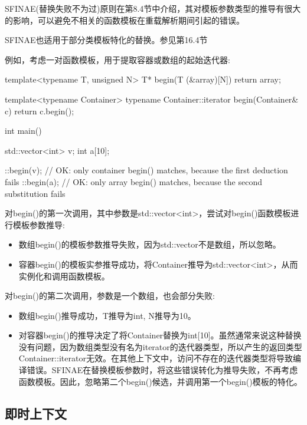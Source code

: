 

SFINAE(替换失败不为过)原则在第8.4节中介绍，其对模板参数类型的推导有很大的影响，可以避免不相关的函数模板在重载解析期间引起的错误。

\begin{notice}SFINAE也适用于部分类模板特化的替换。参见第16.4节
\end{notice}

例如，考虑一对函数模板，用于提取容器或数组的起始迭代器:

\begin{cpp}
template<typename T, unsigned N>
T* begin(T (&array)[N])
{
	return array;
}

template<typename Container>
typename Container::iterator begin(Container& c)
{
	return c.begin();
}

int main()
{
	std::vector<int> v;
	int a[10];
	
	::begin(v); // OK: only container begin() matches, because the first deduction fails
	::begin(a); // OK: only array begin() matches, because the second substitution fails
}
\end{cpp}

对begin()的第一次调用，其中参数是std::vector<int>，尝试对begin()函数模板进行模板参数推导:

\begin{itemize}
\item 
数组begin()的模板参数推导失败，因为std::vector不是数组，所以忽略。

\item 
容器begin()的模板实参推导成功，将Container推导为std::vector<int>，从而实例化和调用函数模板。
\end{itemize}

对begin()的第二次调用，参数是一个数组，也会部分失败:

\begin{itemize}
\item 
数组begin()推导成功，T推导为int, N推导为10。

\item 
对容器begin()的推导决定了将Container替换为int[10]。虽然通常来说这种替换没有问题，因为数组类型没有名为iterator的迭代器类型，所以产生的返回类型Container::iterator无效。在其他上下文中，访问不存在的迭代器类型将导致编译错误。SFINAE在替换模板参数时，将这些错误转化为推导失败，不再考虑函数模板。因此，忽略第二个begin()候选，并调用第一个begin()模板的特化。
\end{itemize}

\subsection{即时上下文}

